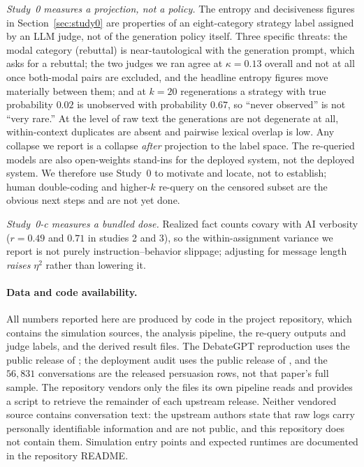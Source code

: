 \documentclass[11pt]{article}
\theoremstyle{definition}
\theoremstyle{remark}
\begin{document}
\emph{Study~0 measures a projection, not a policy.} The entropy and
decisiveness figures in Section~\ref{sec:study0} are properties of an
eight-category strategy label assigned by an LLM judge, not of the
generation policy itself. Three specific threats: the modal category
(rebuttal) is near-tautological with the generation prompt, which asks for a
rebuttal; the two judges we ran agree at $\kappa = 0.13$ overall and not at
all once both-modal pairs are excluded, and the headline entropy figures
move materially between them; and at $k = 20$ regenerations a strategy with
true probability $0.02$ is unobserved with probability $0.67$, so
``never observed'' is not ``very rare.'' At the level of raw text the
generations are not degenerate at all, within-context duplicates are
absent and pairwise lexical overlap is low. Any collapse we report is a
collapse \emph{after} projection to the label space. The re-queried models
are also open-weights stand-ins for the deployed system, not the deployed
system. We therefore use Study~0 to motivate and locate, not to establish;
human double-coding and higher-$k$ re-query on the censored subset are the
obvious next steps and are not yet done.

\emph{Study~0-c measures a bundled dose.} Realized fact counts covary with
AI verbosity ($r = 0.49$ and $0.71$ in studies 2 and 3), so the
within-assignment variance we report is not purely instruction--behavior
slippage; adjusting for message length \emph{raises} $\eta^2$ rather than
lowering it.

\paragraph{Data and code availability.} All numbers reported here are
produced by code in the project repository, which contains the simulation
sources, the analysis pipeline, the re-query outputs and judge labels, and
the derived result files. The DebateGPT reproduction uses the public
release of \citet{salvi2025conversational}; the deployment audit uses the
public release of \citet{hackenburg2025levers}, and the $56{,}831$
conversations are the released persuasion rows, not that paper's full sample.
The repository vendors only the files its own pipeline reads and provides a
script to retrieve the remainder of each upstream release. Neither vendored
source contains conversation text: the upstream authors state that raw logs
carry personally identifiable information and are not public, and this
repository does not contain them. Simulation entry points and expected
runtimes are documented in the repository README.
\end{document}

